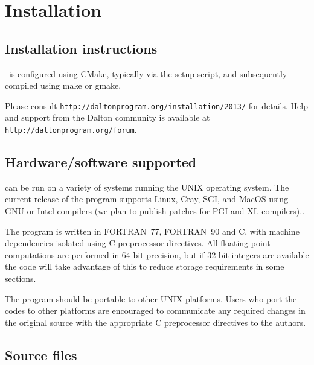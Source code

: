 \chapter{Installation}\label{ch:install}

\section{Installation instructions}

\dalton\ is configured using CMake, typically via the setup script,
and subsequently compiled using make or gmake.

Please consult \verb|http://daltonprogram.org/installation/2013/| for details.
Help and support from the Dalton community is available at \verb|http://daltonprogram.org/forum|.

\section{Hardware/software
supported}\label{sec:hardsoft}

{\dalton} can be run on a variety of systems running the UNIX operating system.
The current release of the program supports Linux, Cray, SGI,
and MacOS using GNU or Intel compilers (we plan to publish patches
for PGI and XL compilers)..

The program is written in FORTRAN~77,
FORTRAN~90 and C, with machine dependencies
isolated using C preprocessor directives.  All
floating-point computations are performed in 64-bit precision, but if 32-bit
integers are available the code will take advantage of this to reduce storage
requirements in some sections.

The program should be portable to other UNIX platforms.  Users
who port the codes to other platforms are encouraged to communicate any
required changes in the original source with the appropriate C preprocessor
directives to the authors.

\section{Source files}\label{sec:source}

